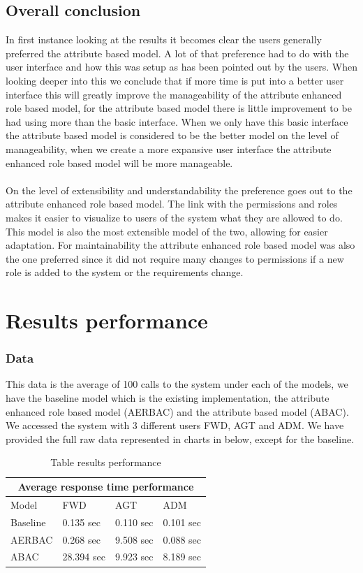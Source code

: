 \subsection{Overall conclusion}
In first instance looking at the results it becomes clear the users generally preferred the attribute based model. 
A lot of that preference had to do with the user interface and how this was setup as has been pointed out by the users.
When looking deeper into this we conclude that if more time is put into a better user interface this will greatly improve the manageability of the attribute enhanced role based model, for the attribute based model there is little improvement to be had using more than the basic interface.
When we only have this basic interface the attribute based model is considered to be the better model on the level of manageability, when we create a more expansive user interface the attribute enhanced role based model will be more manageable. 
\\
\\
On the level of extensibility and understandability the preference goes out to the attribute enhanced role based model.
The link with the permissions and roles makes it easier to visualize to users of the system what they are allowed to do.
This model is also the most extensible model of the two, allowing for easier adaptation.
For maintainability the attribute enhanced role based model was also the one preferred since it did not require many changes to permissions if a new role is added to the system or the requirements change.

\section{Results performance}

\subsubsection{Data}
This data is the average of 100 calls to the system under each of the models, we have the baseline model which is the existing implementation, the attribute enhanced role based model (AERBAC) and the attribute based model (ABAC).
We accessed the system with 3 different users FWD, AGT and ADM.
We have provided the full raw data represented in charts in below, except for the baseline.

\begin{table}[ht]
    \begin{tabular}{ |p{3cm}|p{3cm}|p{3cm}|p{3cm}|  }
        \hline
        \multicolumn{4}{|c|}{Average response time performance} \\
        \hline
        Model & FWD & AGT & ADM\\
        \hline
        Baseline & 0.135 sec   & 0.110 sec   & 0.101 sec  \\
        AERBAC & 0.268 sec    & 9.508 sec    & 0.088 sec  \\
        ABAC & 28.394 sec   & 9.923 sec    & 8.189 sec    \\
        \hline
    \end{tabular}
    \caption{Table results performance}
\end{table}

